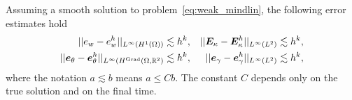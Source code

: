 \begin{conjecture}\label{conj:min}
	Assuming a smooth solution to problem~\eqref{eq:weak_mindlin}, the following error estimates hold 
	\begin{equation}
	\label{eq:errBEC}
	\begin{aligned}
	||e_w - e_w^h||_{L^{\infty}(H^1(\Omega))} &\lesssim h^{k}, \\
	||\bm{e}_\theta - \bm{e}_\theta^h||_{L^{\infty}(H^{\operatorname*{Grad}}(\Omega, \mathbb{R}^2)} &\lesssim h^{k}, \\
	\end{aligned} \quad
	\begin{aligned}
	||\bm{E}_\kappa - \bm{E}_\kappa^h||_{L^{\infty}(L^2)} &\lesssim  h^{k}, \\
	||\bm{e}_\gamma - \bm{e}_\gamma^ h||_{L^{\infty}(L^2)} &\lesssim  h^{k}, \\
	\end{aligned} 
	\end{equation}
	where the notation $a \lesssim  b$ means $a \le C b$. The constant $C$ depends only on the true solution and on the final time.
\end{conjecture}

